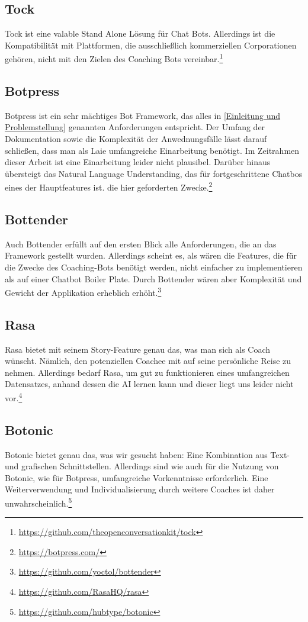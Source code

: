     \subsection{Tock} 
        Tock ist eine valable Stand Alone Lösung für Chat Bots. Allerdings ist die Kompatibilität mit Plattformen, die ausschließlich kommerziellen Corporationen gehören, nicht mit den Zielen des Coaching Bots vereinbar.\footnote{\url{https://github.com/theopenconversationkit/tock}}
        
    \subsection{Botpress} 
        Botpress ist ein sehr mächtiges Bot Framework, das alles in \ref{Einleitung und Problemstellung} genannten Anforderungen entspricht. Der Umfang der Dokumentation sowie die Komplexität der Anwednungsfälle lässt darauf schließen, dass man als Laie umfangreiche Einarbeitung benötigt. Im Zeitrahmen dieser Arbeit ist eine Einarbeitung leider nicht plausibel. Darüber hinaus übersteigt das Natural Language Understanding, das für fortgeschrittene Chatbos eines der Hauptfeatures ist. die hier geforderten Zwecke.\footnote{\url{https://botpress.com/}}
        
    \subsection{Bottender} 
        Auch Bottender erfüllt auf den ersten Blick alle Anforderungen, die an das Framework gestellt wurden. Allerdings scheint es, als wären die Features, die für die Zwecke des Coaching-Bots benötigt werden, nicht einfacher zu implementieren als auf einer Chatbot Boiler Plate. Durch Bottender wären aber Komplexität und Gewicht der Applikation erheblich erhöht.\footnote{\url{https://github.com/yoctol/bottender}}

    \subsection{Rasa} 
        Rasa bietet mit seinem Story-Feature genau das, was man sich als Coach wünscht. Nämlich, den potenziellen Coachee mit auf seine persönliche Reise zu nehmen. Allerdings bedarf Rasa, um gut zu funktionieren eines umfangreichen Datensatzes, anhand dessen die AI lernen kann und dieser liegt uns leider nicht vor.\footnote{\url{https://github.com/RasaHQ/rasa}}
        
    \subsection{Botonic} 
        Botonic bietet genau das, was wir gesucht haben: Eine Kombination aus Text- und grafischen Schnittstellen. Allerdings sind wie auch für die Nutzung von Botonic, wie für Botpress, umfangreiche Vorkenntnisse erforderlich. Eine Weiterverwendung und Individualisierung durch weitere Coaches ist daher unwahrscheinlich.\footnote{\url{https://github.com/hubtype/botonic}}
        
